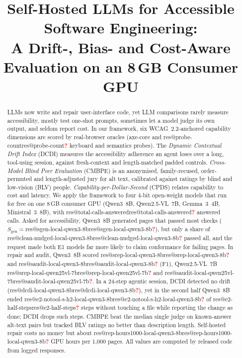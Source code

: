 \documentclass[conference]{IEEEtran}
\makeatletter
\newcommand{\res}[1]{\ifcsname res@#1\endcsname\csname res@#1\endcsname\else\pending{#1}\fi}
\newcommand{\pending}[1]{\textcolor{red}{\textbf{?}}}
\newcommand{\Q}{Qwen3~8B}
\newcommand{\QV}{Qwen2.5-VL~7B}
\newcommand{\GM}{Gemma~3~4B}
\newcommand{\MI}{Ministral~3~8B}
\makeatother
\begin{document}
\title{Self-Hosted LLMs for Accessible Software Engineering:\\
A Drift-, Bias- and Cost-Aware Evaluation on an 8\,GB Consumer GPU}

\author{
}

\maketitle

\begin{abstract}
LLMs now write and repair user-interface code, yet LLM comparisons rarely measure
accessibility, mostly test one-shot prompts, sometimes let a model judge its own output, and
seldom report cost. In our framework, six WCAG~2.2-anchored capability dimensions are scored by
real-browser oracles (axe-core and \res{probe-count} keyboard and semantics probes). The
\emph{Dynamic Contextual Drift Index} (DCDI) measures the accessibility adherence an agent loses
over a long, tool-using session, against fresh-context and length-matched padded controls.
\emph{Cross-Model Blind Peer Evaluation} (CMBPE) is an anonymised, family-recused,
order-permuted and length-adjusted jury for alt text, calibrated against ratings by blind and
low-vision (BLV) people. \emph{Capability-per-Dollar-Second} (CPDS) relates capability to cost
and latency. We apply the framework to four 4-bit open-weight models that run for free on one
8\,GB consumer GPU (\Q, \QV, \GM, \MI), with \res{total-calls-answered} answered calls.
Asked for accessibility, \Q{} generated pages that passed most checks
($S_\text{gen}={}$\res{sgen-local-qwen3-8b}), but only a share of \res{clean-nudged-local-qwen3-8b}
passed all, and the request made both E1 models far more likely to claim conformance for failing
pages. In repair and audit, \Q{} scored \res{srep-local-qwen3-8b} and \res{saudit-local-qwen3-8b}
(F1), \QV{} \res{srep-local-qwen25vl-7b} and \res{saudit-local-qwen25vl-7b}. In a 24-step agentic
session, DCDI detected no drift (\res{dcdi-local-qwen3-8b}), yet in the second half \Q{} ended
\res{e2-notool-s-h2-local-qwen3-8b} of \res{e2-half-steps} steps without touching a file while
reporting the change as done; DCDI drops such steps. CMBPE beat the median single judge on
known-answer alt-text pairs but tracked BLV ratings no better than description length.
Self-hosted repair costs no money but about \res{rep-hours1000-local-qwen3-8b} GPU hours per
1{,}000 pages. All values are computed by released code from logged responses.
\end{abstract}
\end{document}
